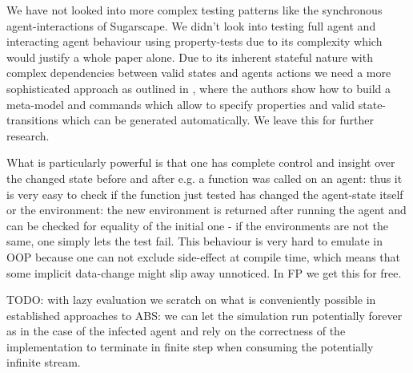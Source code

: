 We have not looked into more complex testing patterns like the synchronous agent-interactions of Sugarscape. We didn't look into testing full agent and interacting agent behaviour using property-tests due to its complexity which would justify a whole paper alone. Due to its inherent stateful nature with complex dependencies between valid states and agents actions we need a more sophisticated approach as outlined in \cite{de_vries_-depth_2019}, where the authors show how to build a meta-model and commands which allow to specify properties and valid state-transitions which can be generated automatically. We leave this for further research.

What is particularly powerful is that one has complete control and insight over the changed state before and after e.g. a function was called on an agent: thus it is very easy to check if the function just tested has changed the agent-state itself or the environment: the new environment is returned after running the agent and can be checked for equality of the initial one - if the environments are not the same, one simply lets the test fail. This behaviour is very hard to emulate in OOP because one can not exclude side-effect at compile time, which means that some implicit data-change might slip away unnoticed. In FP we get this for free.

TODO: with lazy evaluation we scratch on what is conveniently possible in established approaches to ABS: we can let the simulation run potentially forever as in the case of the infected agent and rely on the correctness of the implementation to terminate in finite step when consuming the potentially infinite stream.